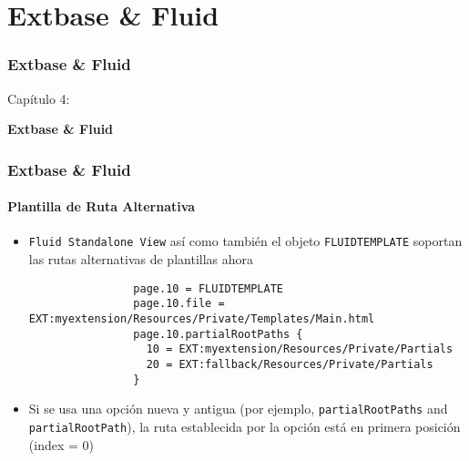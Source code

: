 %

\section{Extbase \& Fluid}
\begin{frame}[fragile]
	\frametitle{Extbase \& Fluid}

	\begin{center}\huge{Capítulo 4:}\end{center}
	\begin{center}\huge{\color{typo3darkgrey}\textbf{Extbase \& Fluid}}\end{center}

\end{frame}


\begin{frame}[fragile]
	\frametitle{Extbase \& Fluid}
	\framesubtitle{Plantilla de Ruta Alternativa}

	\lstset{
		basicstyle=\tiny\ttfamily
	}

	\begin{itemize}
		\item \texttt{Fluid Standalone View} así como también el objeto \texttt{FLUIDTEMPLATE} soportan las rutas alternativas de plantillas ahora

			\begin{lstlisting}
				page.10 = FLUIDTEMPLATE
				page.10.file = EXT:myextension/Resources/Private/Templates/Main.html
				page.10.partialRootPaths {
				  10 = EXT:myextension/Resources/Private/Partials
				  20 = EXT:fallback/Resources/Private/Partials
				}
			\end{lstlisting}

		\item Si se usa una opción nueva y antigua (por ejemplo, \texttt{partialRootPaths} and \texttt{partialRootPath}),
			la ruta establecida por la opción está en primera posición (index = 0)

	\end{itemize}

\end{frame}

